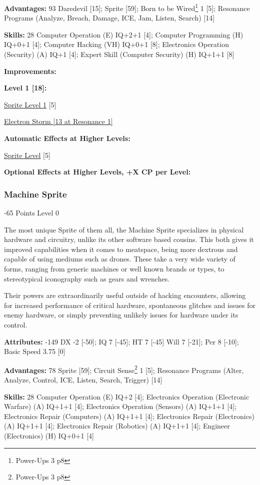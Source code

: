 \begin{multicols*}{3}
\textbf{Advantages:} 93
Daredevil [15]; Sprite [59]; Born to be Wired\footnote{Power-Ups 3 p8} 1 [5]; Resonance Programs (Analyze, Breach, Damage, ICE, Jam, Listen, Search) [14]

\textbf{Skills:} 28
Computer Operation (E) IQ+2+1 [4]; Computer Programming (H) IQ+0+1 [4]; Computer Hacking (VH) IQ+0+1 [8]; Electronics Operation (Security) (A) IQ+1 [4]; Expert Skill (Computer Security) (H) IQ+1+1 [8]

\textbf{ Improvements:}

\textbf{Level 1 [18]:}

\hyperref[sprite_level]{Sprite Level 1} [5]

\hyperref[electron_storm]{Electron Storm [13 at Resonance 1]}

\textbf{Automatic Effects at Higher Levels:}

\hyperref[sprite_level]{Sprite Level} [5]

\textbf{Optional Effects at Higher Levels, +X CP per Level:}


\subsubsection{Machine Sprite}
\begin{flushright}
	-65 Points Level 0
\end{flushright}

The most unique Sprite of them all, the Machine Sprite specializes in physical hardware and circuitry, unlike its other software based cousins. This both gives it improved capabilities when it comes to meatspace, being more dextrous and capable of using mediums such as drones. These take a very wide variety of forms, ranging from generic machines or well known brands or types, to stereotypical iconography such as gears and wrenches.

Their powers are extraordinarily useful outside of hacking encounters, allowing for increased performance of critical hardware, spontaneous glitches and issues for enemy hardware, or simply preventing unlikely issues for hardware under its control.

\textbf{Attributes:} -149
DX -2 [-50]; IQ 7 [-45]; HT 7 [-45]
Will 7 [-21]; Per 8 [-10]; Basic Speed 3.75 [0]

\textbf{Advantages:} 78
Sprite [59]; Circuit Sense\footnote{Power-Ups 3 p8} 1 [5]; Resonance Programs (Alter, Analyze, Control, ICE, Listen, Search, Trigger) [14]

\textbf{Skills:} 28
Computer Operation (E) IQ+2 [4]; Electronics Operation (Electronic Warfare) (A) IQ+1+1 [4]; Electronics Operation (Sensors) (A) IQ+1+1 [4]; Electronics Repair (Computers) (A) IQ+1+1 [4]; Electronics Repair (Electronics) (A) IQ+1+1 [4];  Electronics Repair (Robotics) (A) IQ+1+1 [4];  Engineer (Electronics) (H) IQ+0+1 [4]


\end{multicols*}
